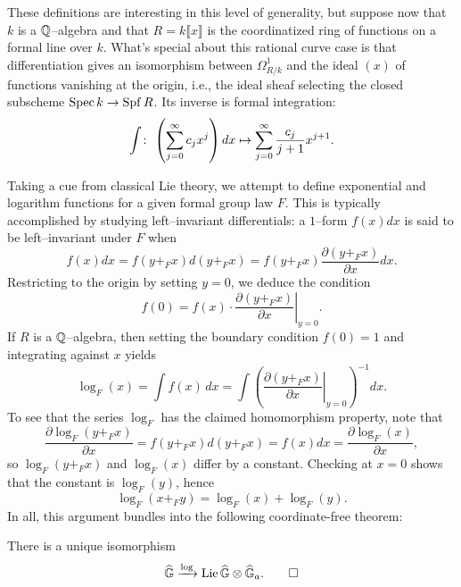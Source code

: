 These definitions are interesting in this level of generality, but suppose now that $k$ is a $\mathbb{Q}$--algebra and that $R = k\llbracket x \rrbracket$ is the coordinatized ring of functions on a formal line over $k$.  What's special about this rational curve case is that differentiation gives an isomorphism between $\Omega^1_{R/k}$ and the ideal $(x)$ of functions vanishing at the origin, i.e., the ideal sheaf selecting the closed subscheme $\operatorname{Spec} k \to \operatorname{Spf} R$.  Its inverse is formal integration: \[\int \colon\thinspace \left(\sum_{j=0}^\infty c_j x^j \right) dx \mapsto \sum_{j=0}^\infty \frac{c_j}{j+1} x^{j+1}.\]

Taking a cue from classical Lie theory, we attempt to define exponential and logarithm functions for a given formal group law $F$.  This is typically accomplished by studying left--invariant differentials: a $1$--form $f(x) dx$ is said to be left--invariant under $F$ when \[f(x) dx = f(y +_F x) d(y +_F x) = f(y +_F x) \frac{\partial(y +_F x)}{\partial x} dx.\]  Restricting to the origin by setting $y = 0$, we deduce the condition \[f(0) = f(x) \cdot \left. \frac{\partial(y +_F x)}{\partial x} \right|_{y=0}.\]  If $R$ is a $\mathbb{Q}$--algebra, then setting the boundary condition $f(0) = 1$ and integrating against $x$ yields \[\log_F(x) = \int f(x) \, dx = \int \left( \left. \frac{\partial(y +_F x)}{\partial x} \right|_{y=0} \right)^{-1} dx.\]  To see that the series $\log_F$ has the claimed homomorphism property, note that \[\frac{\partial \log_F(y +_F x)}{\partial x} = f(y +_F x) d(y +_F x) = f(x) dx = \frac{\partial \log_F(x)}{\partial x},\] so $\log_F(y +_F x)$ and $\log_F(x)$ differ by a constant.  Checking at $x = 0$ shows that the constant is $\log_F(y)$, hence \[\log_F(x +_F y) = \log_F(x) + \log_F(y).\]  In all, this argument bundles into the following coordinate-free theorem:
\begin{theorem}\label{RationalFGLsHaveLogarithms}
There is a unique isomorphism \[\widehat{\mathbb G} \xrightarrow{\log} \operatorname{Lie} \widehat{\mathbb G} \otimes \widehat{\mathbb G}_a. \qed\] 
\end{theorem}







